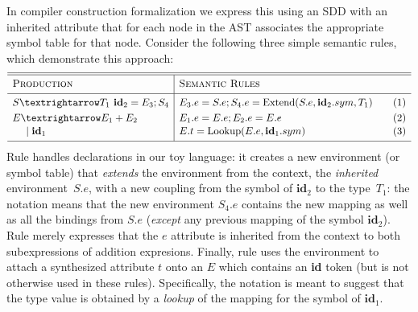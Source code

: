 \documentclass[11pt]{article} %
\begin{document}
In compiler construction formalization we express this using an SDD with an inherited attribute that
for each node in the AST associates the appropriate symbol table for that node. Consider the
following three simple semantic rules, which demonstrate this approach:
\begin{equation*}
  \begin{array}{l|ll}
    \hline
    \hline
    \textsc{Production}  & \textsc{Semantic Rules} \Bigstrut&\\
    \hline
    S → T_1 ~ \textbf{id}_2 = E_3; S_4
    &
    E_3.e = S.e; 
    S_4.e = \op{Extend}(S.e, \textbf{id}_2.sym, T_1) \Bigstrut\quad
    &\thetag{1}
    \\[\jot]
    E → E_1 + E_2
    &
    E_1.e=E.e; E_2.e=E.e
    &\thetag{2}
    \\[1pt]
    \quad~\mid \textbf{id}_1
    &
    E.t = \op{Lookup}(E.e, \textbf{id}_1.sym)
    &\thetag{3}
    \\[\jot]
    \hline
  \end{array}
\end{equation*}
Rule  handles declarations in our toy language: it creates a new environment (or symbol
table) that \emph{extends} the environment from the context, the \emph{inherited} environment~$S.e$,
with a new coupling from the symbol of $\textbf{id}_2$ to the type~$T_1$: the notation means that
the new environment $S_4.e$ contains the new mapping as well as all the bindings from $S.e$
(\emph{except} any previous mapping of the symbol $\textbf{id}_2$).
Rule  merely expresses that the $e$ attribute is inherited from the context to both
subexpressions of addition expresions.
Finally, rule  uses the environment to attach a synthesized attribute $t$ onto an $E$
which contains an \textbf{id} token (but is not otherwise used in these rules). Specifically, the
notation is meant to suggest that the type value is obtained by a \emph{lookup} of the mapping for
the symbol of $\textbf{id}_1$.
\end{document}

